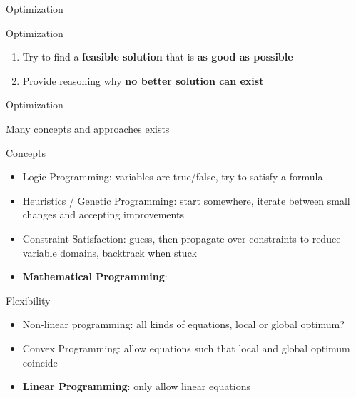 \documentclass[10pt]{beamer}
\begin{document}
\begin{frame}[fragile]{Optimization}
	
\begin{block}{Optimization}
  \begin{enumerate}[<+- | alert@+>]
    \item Try to find a \textbf{feasible solution} that is \textbf{as good as possible}
    \item Provide reasoning why \textbf{no better solution can exist}
  \end{enumerate}
\end{block}


\end{frame}

\begin{frame}[fragile]{Optimization}

  Many concepts and approaches exists 

      \begin{block}{Concepts}
	  \begin{itemize}
		\item Logic Programming: variables are true/false, try to satisfy a formula
		\item Heuristics / Genetic Programming: start somewhere, iterate between small changes and accepting improvements
		\item Constraint Satisfaction: guess, then propagate over constraints to reduce variable domains, backtrack when stuck
		\item \textbf{Mathematical Programming}: 
	  \end{itemize}
	  \end{block}
      \begin{block}{Flexibility}
		\begin{itemize}
			\item Non-linear programming: all kinds of equations, local or global optimum?
			\item Convex Programming: allow equations such that local and global optimum coincide
			\item \textbf{Linear Programming}: only allow linear equations
		\end{itemize}
	  \end{block}

\end{frame}
\end{document}

